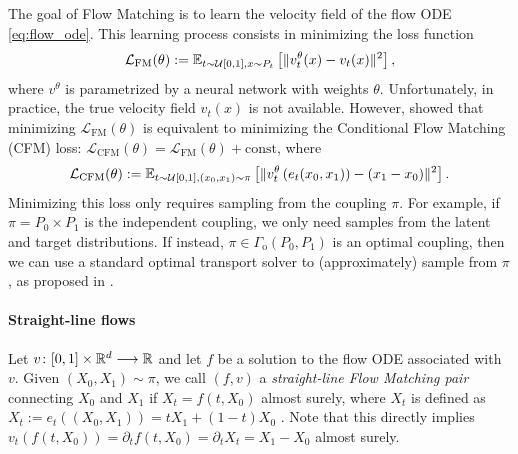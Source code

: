 \documentclass{article} %
\theoremstyle{definition}
\newtheorem{remark}[theorem]{Remark}
\begin{document}
The goal of Flow Matching is to learn the velocity field of the flow ODE \eqref{eq:flow_ode}. This learning process consists in minimizing the loss function
\begin{align}\label{fm}
    \mathcal{L}_{\text{FM}}(\theta) :=\mathbb{E}_{t\sim \mathcal U [0,1],x\sim P_t}\left[\|v^\theta_t(x)-v_t(x)\|^2\right],
\end{align}
where $v^\theta$ is parametrized by a neural network with weights $\theta$.
Unfortunately, in practice, the true velocity field $v_t(x)$ is not available.
However,
\citet{lipman2023flow} showed that
minimizing $\mathcal{L}_{\text{FM}}(\theta) $ is equivalent to minimizing the Conditional Flow Matching (CFM) loss:  $\mathcal{L}_{\text{CFM}}(\theta)  = \mathcal{L}_{\text{FM}}(\theta) + \text{const}$, where
\begin{align} \label{cfm}
\mathcal{L}_{\text{CFM}}(\theta):=\mathbb{E}_{t\sim \mathcal U [0,1],(x_0,x_1)\sim\pi}\left[\|v^\theta_t \left(e_t(x_0, x_1)\right)-(x_1-x_0)\|^2\right] .
\end{align} 
Minimizing this loss only requires sampling from the coupling $\pi$. For example, if $\pi = P_0 \times P_1$ is the independent coupling, we only need samples from the latent and target distributions. If instead, $\pi \in \Gamma_{\text{o}}(P_0, P_1)$ is an optimal coupling, then we can use a standard optimal transport solver to (approximately) sample from $\pi$, as proposed in \citet{pooladian2023multisample, tong2024improving}. 



\paragraph{Straight-line flows}
Let $v\colon [0,1] \times \mathbb{R}^d \longrightarrow \mathbb{R}$ and let $f$ be a solution to the flow ODE associated with $v$.
Given $(X_0,X_1) \sim \pi$, we call $(f,v)$
a \emph{straight-line Flow Matching pair} connecting $X_0$ and $X_1$ if $X_t = f(t,X_0)$ almost surely, where $X_t$ is defined as $X_t:= e_t((X_0,X_1)) = t X_1 + (1-t)X_0$ \citep{liu2023flow, pooladian2023multisample}. Note that this directly implies $v_t(f(t,X_0)) = \partial_t f(t,X_0)  = \partial_t X_t = X_1-X_0$ almost surely.
\end{document}
